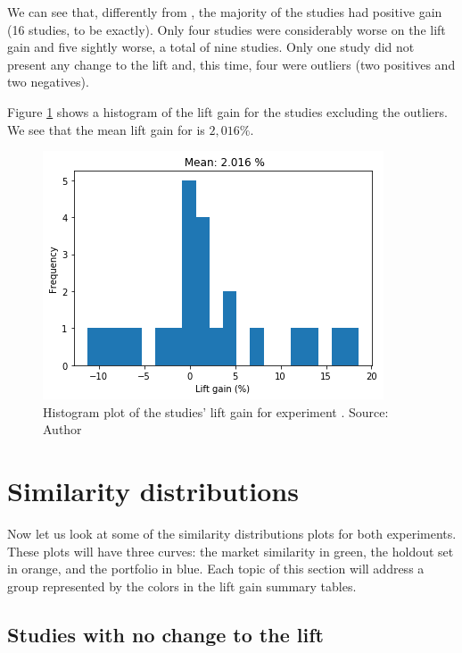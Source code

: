 We can see that, differently from \nameExperimentI{}, the majority of the studies had positive gain (16 studies, to be exactly). Only four studies were considerably worse on the lift gain and five sightly worse, a total of nine studies. Only one study did not present any change to the lift and, this time, four were outliers (two positives and two negatives).

Figure \ref{fig:lift-hist-plot-exp-ii} shows a histogram of the lift gain for the studies excluding the outliers. We see that the mean lift gain for \nameExperimentII{} is $2,016 \%$.

\begin{figure}[h]
   \centering
   \includegraphics[width=\linewidth]{fig/ch4-lift-hist-plot-exp-ii.png}
   \caption{Histogram plot of the studies' lift gain for experiment \nameExperimentII{}. Source: Author}
   \label{fig:lift-hist-plot-exp-ii}
\end{figure}

\section{Similarity distributions}
\label{ch:simi-distis}

Now let us look at some of the similarity distributions plots for both experiments. These plots will have three curves: the market similarity in green, the holdout set in orange, and the portfolio in blue. Each topic of this section will address a group represented by the colors in the lift gain summary tables. 

\subsection{Studies with no change to the lift}

